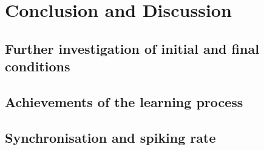 \newpage
\section{Conclusion and Discussion} \label{sec:ConclusionAndDiscussion}

\subsection{Further investigation of initial and final conditions}

\subsection{Achievements of the learning process}

\subsection{Synchronisation and spiking rate}